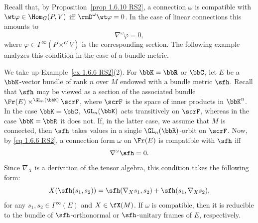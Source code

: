 Recall that, by Proposition~\ref{prop 1.6.10 RS2}, a connection $\omega$ is compatible with $\wt\varphi\in\Hom_G(P,V)$ iff $\rmD^\omega\wt\varphi=0$. In the case of linear connections this amounts to 
\[\nabla^\omega\varphi=0,\label{eq 1.6.6 RS2}\]
where $\varphi\in\Gamma^\infty(P\times^G V)$ is the corresponding section.  The following example analyzes this condition in the case of a bundle metric.

\begin{example}\label{ex 1.6.12 RS2}
    We take up Example~\ref{ex 1.6.6 RS2}(2). For $\bbK=\bbR$ or $\bbC$, let $E$ be a $\bbK$-vector bundle of rank $n$ over $M$ endowed with a bundle metric $\sfh$. Recall that $\sfh$ may be viewed as a section of the associated bundle $\Fr(E)\times^{\GL_n(\bbK)}\scrF$, where $\scrF$ is the space of inner products in $\bbK^n$. In the case $\bbK=\bbC$, $\GL_n(\bbK)$ acts transitively on $\scrF$, whereas in the case $\bbK=\bbR$ it does not. If, in the latter case, we assume that $M$ is connected, then $\sfh$ takes values in a single $\GL_n(\bbR)$-orbit on $\scrF$. Now, by \eqref{eq 1.6.6 RS2}, a connection form $\omega$ on $\Fr(E)$ is compatible with $\sfh$ iff 
    \[\nabla^\omega\sfh=0.\]
    Since $\nabla_X$ is a derivation of the tensor algebra, this condition takes the following form:
    \[X(\sfh(s_1,s_2))=\sfh(\nabla_X s_1,s_2)+\sfh(s_1,\nabla_X s_2),\]
    for any $s_1,s_2\in\Gamma^\infty(E)$ and $X\in\fX(M)$. If $\omega$ is compatible, then it is reducible to the bundle of $\sfh$-orthonormal or $\sfh$-unitary frames of $E$, respectively.
\end{example}

